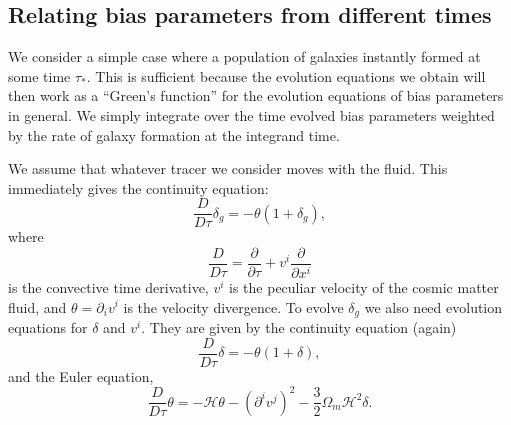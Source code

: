 \documentclass[11pt]{article}
\begin{document}
\subsection{Relating bias parameters from different times}
We consider a simple case where a population of galaxies instantly formed at some time $\tau_*$. This is sufficient because the evolution equations we obtain will then work as a ``Green's function'' for the evolution equations of bias parameters in general. We simply integrate over the time evolved bias parameters weighted by the rate of galaxy formation at the integrand time.

We assume that whatever tracer we consider moves with the fluid. This immediately gives the continuity equation:
\begin{equation}
    \frac{D}{D\tau}\delta_g = -\theta(1+\delta_g),
    \label{eq:conteqtracer}
\end{equation}
where
\begin{equation}
    \frac{D}{D\tau} = \frac{\partial}{\partial \tau} + v^i\frac{\partial}{\partial x^i}
\end{equation}
is the convective time derivative, $v^i$ is the peculiar velocity of the cosmic matter fluid, and $\theta=\partial_i v^i$ is the velocity divergence. %
To evolve $\delta_g$ we also need evolution equations for $\delta$ and $v^i$. They are given by the continuity equation (again)
\begin{equation}
    \frac{D}{D\tau}\delta = -\theta(1+\delta),
    \label{eq:conteq}
\end{equation}
and the Euler equation,
\begin{equation}
    \frac{D}{D\tau}\theta = -\mathcal H \theta - (\partial^iv^j)^2 - \frac{3}{2}\Omega_m\mathcal H^2\delta.
\end{equation}
\end{document}

